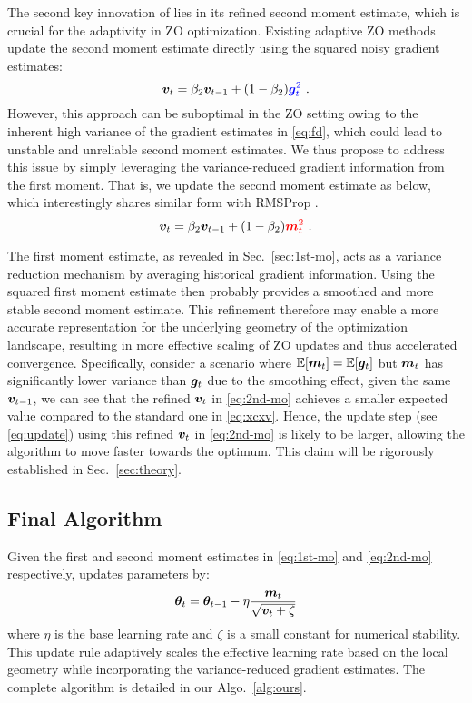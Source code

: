 The second key innovation of \ours{} lies in its refined second moment estimate, which is crucial for the adaptivity in ZO optimization. Existing adaptive ZO methods \citep{zo-adamm, nazari2020adaptive} update the second moment estimate directly using the squared noisy gradient estimates:
\begin{equation}\label{eq:xcxv}
    {\bm{v}}_t = \beta_2{\bm{v}}_{t-1} + (1 - \beta_2)\textcolor{blue}{{\bm{g}}_{t}^2} \ .
\end{equation}
However, this approach can be suboptimal in the ZO setting owing to the inherent high variance of the gradient estimates in \eqref{eq:fd}, which could lead to unstable and unreliable second moment estimates. We thus propose to address this issue by simply leveraging the variance-reduced gradient information from the first moment. That is, we update the second moment estimate as below, which interestingly shares similar form with RMSProp \citep{rmsprop}.
\begin{equation}\label{eq:2nd-mo}
    \vv_t = \beta_2\vv_{t-1} + (1 - \beta_2)\textcolor{red}{\vm_t^2} \ .
\end{equation}

The first moment estimate, as revealed in Sec.~\ref{sec:1st-mo}, acts as a variance reduction mechanism by averaging historical gradient information. Using the squared first moment estimate then probably provides a smoothed and more stable second moment estimate. This refinement therefore may enable a more accurate representation for the underlying geometry of the optimization landscape, resulting in more effective scaling of ZO updates and thus accelerated convergence. Specifically, consider a scenario where $\mathbb{E}[{\bm{m}}_t] = \mathbb{E}[{\bm{g}}_t]$ but ${\bm{m}}_t$ has significantly lower variance than ${\bm{g}}_t$ due to the smoothing effect, given the same ${\bm{v}}_{t-1}$, we can see that the refined ${\bm{v}}_t$ in \eqref{eq:2nd-mo} achieves a smaller expected value compared to the standard one in \eqref{eq:xcxv}. Hence, the update step (see \eqref{eq:update}) using this refined ${\bm{v}}_t$ in \eqref{eq:2nd-mo} is likely to be larger, allowing the algorithm to move faster towards the optimum. This claim will be rigorously established in Sec.~\ref{sec:theory}.

\subsection{Final Algorithm}

Given the first and second moment estimates in \eqref{eq:1st-mo} and \eqref{eq:2nd-mo} respectively, \ours{} updates parameters by:
\begin{equation}\label{eq:update}
    \boldsymbol{\theta}_t = \boldsymbol{\theta}_{t-1} - \eta \frac{{\bm{m}}_t}{\sqrt{{\bm{v}}_t + \zeta}}
\end{equation}
where $\eta$ is the base learning rate and $\zeta$ is a small constant for numerical stability. This update rule adaptively scales the effective learning rate based on the local geometry while incorporating the variance-reduced gradient estimates. The complete \ours{} algorithm is detailed in our Algo.~\ref{alg:ours}.


